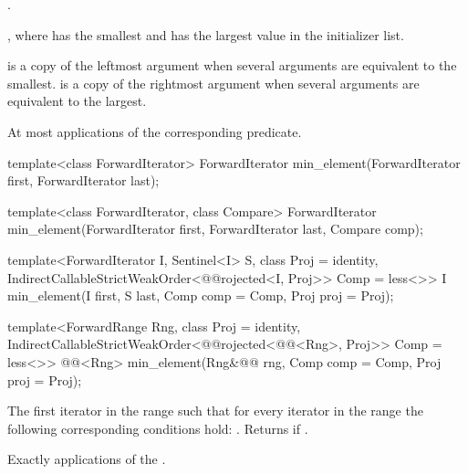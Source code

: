 \begin{itemdescr}
\pnum
\requires {}.

\pnum
\returns {}, where  has the smallest and  has the
largest value in the initializer list.

\pnum
\remarks {} is a copy of the leftmost argument when several arguments are equivalent to
the smallest.  is a copy of the rightmost argument when several arguments are
equivalent to the largest.

\pnum
\complexity At most 
applications of the corresponding predicate.
\end{itemdescr}

%
\begin{removedblock}
\begin{itemdecl}
template<class ForwardIterator>
  ForwardIterator min_element(ForwardIterator first, ForwardIterator last);

template<class ForwardIterator, class Compare>
  ForwardIterator min_element(ForwardIterator first, ForwardIterator last,
                            Compare comp);
\end{itemdecl}
\end{removedblock}
\begin{addedblock}
\begin{itemdecl}
template<ForwardIterator I, Sentinel<I> S, class Proj = identity,
    IndirectCallableStrictWeakOrder<@@rojected<I, Proj>> Comp = less<>>
  I min_element(I first, S last, Comp comp = Comp{}, Proj proj = Proj{});

template<ForwardRange Rng, class Proj = identity,
    IndirectCallableStrictWeakOrder<@@rojected<@@<Rng>, Proj>> Comp = less<>>
  @@<Rng>
    min_element(Rng&@\newtxt{\&}@ rng, Comp comp = Comp{}, Proj proj = Proj{});
\end{itemdecl}
\end{addedblock}

\begin{itemdescr}
\pnum
\returns
The first iterator
in the range
such that for every iterator
in the range
the following corresponding conditions hold:
.
Returns
if
.

\pnum
\complexity
Exactly
applications of the .
\end{itemdescr}

